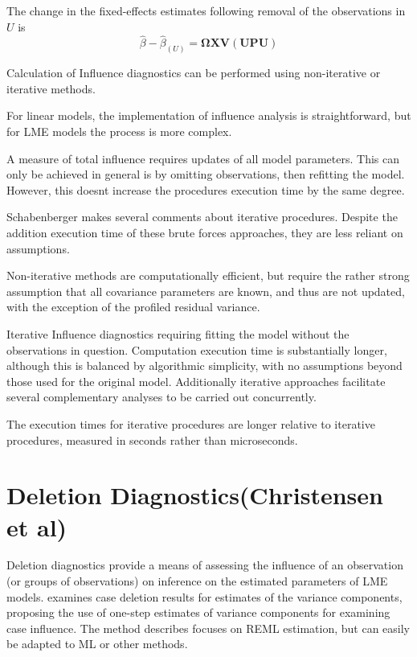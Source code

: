 \documentclass[12pt, a4paper]{report}
\theoremstyle{plain}
\theoremstyle{definition}
\theoremstyle{remark}
\begin{document}



The change in the fixed-effects estimates following removal of the observations in $U$ is
\[ \hat{\beta} - \hat{\beta}_{(U)} = \boldsymbol{\Omega}\boldsymbol{X}\boldsymbol{V}
\left( \boldsymbol{U} \boldsymbol{P}\boldsymbol{U}\right)   \]

Calculation of Influence diagnostics can be performed using non-iterative or iterative methods.

For linear models, the implementation of influence analysis is straightforward, but for LME models the process is more complex.


A measure of total influence requires updates of all model parameters. This can only be achieved in general is by omitting observations, then refitting the model.
However, this doesnt increase the procedures execution time by the same degree.





Schabenberger makes several comments about iterative procedures. Despite the addition execution time of these brute forces 
approaches, they are less reliant on assumptions.


Non-iterative methods are computationally efficient, but require the rather strong assumption that all 
covariance parameters are known, and thus are not updated, with the exception of the profiled residual variance.

Iterative Influence diagnostics requiring fitting the model without the observations in question. Computation execution time is substantially longer, although this is balanced by algorithmic 
simplicity, with no assumptions beyond those used for the original model. Additionally iterative approaches facilitate several complementary analyses to be carried out 
concurrently.

The execution times for iterative procedures are longer relative to iterative procedures, measured in seconds rather than microseconds. 


	\section{Deletion Diagnostics(Christensen et al)}
		Deletion diagnostics provide a means of assessing the influence of an observation (or groups of observations) on inference on the estimated parameters of LME models.
	\citet{Christensen}examines case deletion results for estimates of
		the variance components, proposing the use of one-step estimates
		of variance components for examining case influence. The method
		describes focuses on REML estimation, but can easily be adapted to
		ML or other methods.
\end{document}
